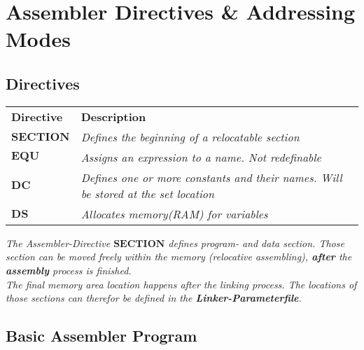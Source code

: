 \section{Assembler Directives \& Addressing Modes}

\subsection{Directives}

\begin{tabular}{lp{}}
    \textbf{Directive} & \textbf{Description} \\
    $\mathbf{SECTION}$ & \textit{Defines the beginning of a relocatable section} \\
    $\mathbf{EQU}$     & \textit{Assigns an expression to a name. Not redefinable} \\
    $\mathbf{DC}$      & \textit{Defines one or more constants and their names. Will be stored at the set location} \\
    $\mathbf{DS}$      & \textit{Allocates memory(RAM) for variables} \\
\end{tabular}

\textit{
    The Assembler-Directive $\mathbf{SECTION}$ defines program- and
    data section. Those section can be moved freely within the memory (relocative
    assembling), \textbf{after} the \textbf{assembly} process is finished. \\
    The final memory area location happens after the linking process. The locations
    of those sections can therefor be defined in the \textbf{Linker-Parameterfile}.
}

\subsection{Basic Assembler Program}

